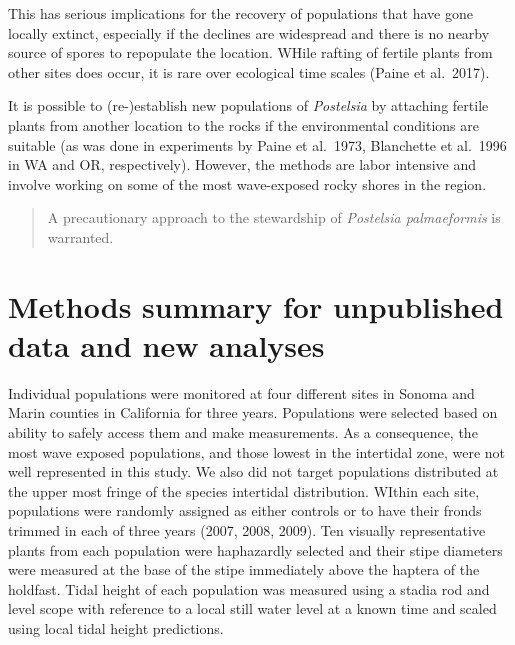 \documentclass[
]{article}
\begin{document}
This has serious implications for the recovery of populations that have gone locally extinct, especially if the declines are widespread and there is no nearby source of spores to repopulate the location. WHile rafting of fertile plants from other sites does occur, it is rare over ecological time scales (Paine et al.~2017).

It is possible to (re-)establish new populations of \emph{Postelsia} by attaching fertile plants from another location to the rocks if the environmental conditions are suitable (as was done in experiments by Paine et al.~1973, Blanchette et al.~1996 in WA and OR, respectively). However, the methods are labor intensive and involve working on some of the most wave-exposed rocky shores in the region.

\begin{quote}
A precautionary approach to the stewardship of \emph{Postelsia palmaeformis} is warranted.
\end{quote}

\newpage

\hypertarget{methods-summary-for-unpublished-data-and-new-analyses}{%
\section{Methods summary for unpublished data and new analyses}\label{methods-summary-for-unpublished-data-and-new-analyses}}

Individual populations were monitored at four different sites in Sonoma and Marin counties in California for three years. Populations were selected based on ability to safely access them and make measurements. As a consequence, the most wave exposed populations, and those lowest in the intertidal zone, were not well represented in this study. We also did not target populations distributed at the upper most fringe of the species intertidal distribution. WIthin each site, populations were randomly assigned as either controls or to have their fronds trimmed in each of three years (2007, 2008, 2009). Ten visually representative plants from each population were haphazardly selected and their stipe diameters were measured at the base of the stipe immediately above the haptera of the holdfast. Tidal height of each population was measured using a stadia rod and level scope with reference to a local still water level at a known time and scaled using local tidal height predictions.
\end{document}
